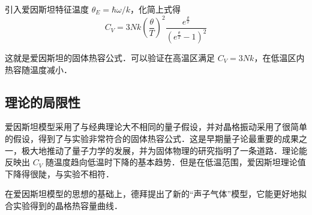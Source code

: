 引入爱因斯坦特征温度 $\theta_E=\hbar\omega/k$，化简上式得
\begin{equation}
C_V=3Nk\left(\frac{\theta}{T}\right)^2\frac{e^{\frac{\theta}{T}}}{(e^{\frac{\theta}{T}}-1)^2}
\end{equation}

这就是爱因斯坦的固体热容公式．可以验证在高温区满足 $C_V=3Nk$，在低温区内热容随温度减小．

\subsection{理论的局限性}
爱因斯坦模型采用了与经典理论大不相同的量子假设，并对晶格振动采用了很简单的假设，得到了与实验非常符合的固体热容公式．这是早期量子论最重要的成果之一，极大地推动了量子力学的发展，并为固体物理的研究指明了一条道路．理论能反映出 $C_V$ 随温度趋向低温时下降的基本趋势．但是在低温范围，爱因斯坦理论值下降得很陡，与实验不相符．

在爱因斯坦模型的思想的基础上，德拜提出了新的“声子气体”模型，它能更好地拟合实验得到的晶格热容量曲线．